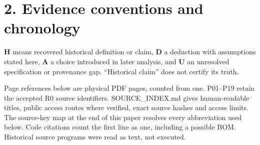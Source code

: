 \documentclass[11pt,a4paper]{article}
\begin{document}
\clearpage
\section*{2. Evidence conventions and chronology}

\textbf{H} means recovered historical definition or claim, \textbf{D} a deduction with assumptions stated here, \textbf{A} a choice introduced in later analysis, and \textbf{U} an unresolved specification or provenance gap. ``Historical claim'' does not certify its truth.


Page references below are physical PDF pages, counted from one. P01--P19 retain the accepted R0 source identifiers. SOURCE\_\allowbreak{}INDEX.md gives human-readable titles, public access routes where verified, exact source hashes and access limits. The source-key map at the end of this paper resolves every abbreviation used below. Code citations count the first line as one, including a possible BOM. Historical source programs were read as text, not executed.
\end{document}
